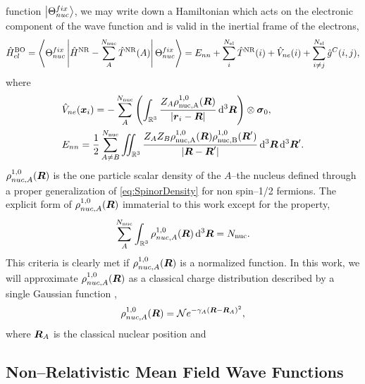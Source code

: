 function $\left\vert \Theta_{nuc}^{fix} \right\rangle$, we may write down a Hamiltonian which acts on the electronic 
component of the wave function and is valid in the inertial frame of the electrons,
\begin{equation}
\label{eq:NRBOH}
\hat{H}^{\mathrm{BO}}_{el} = \left\langle \Theta_{nuc}^{fix} \left\vert \hat{H}^{\mathrm{NR}} - \sum_A^{N_\mathrm{nuc}}\hat{T}^{\mathrm{NR}}(A) \right\vert \Theta_{nuc}^{fix} \right\rangle
=E_{nn} + \sum_i^{N_\mathrm{el}} \hat{T}^{\mathrm{NR}}(i) + \hat{V}_{ne}(i) + \sum_{i\neq j}^{N_\mathrm{el}} \hat{g}^C(i,j),
\end{equation}
where
\begin{align}
  &\hat{V}_{ne}(\boldsymbol{x}_i) = 
    -\sum^{N_\mathrm{nuc}}_A \left(\int_{\mathbb R^3} \frac{Z_A\rho^{1,0}_\mathrm{nuc,A}(\boldsymbol{R})}{\vert \boldsymbol{r}_i - \boldsymbol{R} \vert} \,\mathrm{d}^3\boldsymbol{R}\right) \otimes \boldsymbol{\sigma}_{0}, \label{eq:Vne}\\
&E_{nn} = \frac{1}{2} \sum^{N_\mathrm{nuc}}_{A\neq B} \int\mkern-12mu\int_{\mathbb R^3} \frac{Z_AZ_B\rho^{1,0}_\mathrm{nuc,A}(\boldsymbol{R})\rho^{1,0}_\mathrm{nuc,B}(\boldsymbol{R}')}{\vert \boldsymbol{R} - \boldsymbol{R}' \vert} \,\mathrm{d}^3\boldsymbol{R} \,\mathrm{d}^3\boldsymbol{R}'.
\end{align}
$\rho^{1,0}_{nuc,A}(\boldsymbol{R})$ is the one particle scalar density of the $A$--the nucleus defined through a proper generalization of
\cref{eq:SpinorDensity} for non spin--1/2 fermions. The explicit form of $\rho^{1,0}_{nuc,A}(\boldsymbol{R})$ immaterial
to this work except for the property,
\begin{equation}
\sum_A^{N_\mathrm{nuc}} \int_{\mathbb R^3} \rho_{nuc,A}^{1,0}(\boldsymbol{R}) \,\mathrm{d}^3\boldsymbol{R} = N_\mathrm{nuc}.
\end{equation}
This criteria is clearly met if $\rho^{1,0}_{nuc,A}(\boldsymbol{R})$ is a normalized function. In this work, we will approximate
$\rho^{1,0}_{nuc,A}(\boldsymbol{R})$ as a classical charge distribution described by a single Gaussian function ,
\begin{equation}
\rho^{1,0}_{nuc,A}(\boldsymbol{R}) = \mathcal{N} e^{-\gamma_A(\boldsymbol{R} - \boldsymbol{R}_A)^2},
\end{equation}
where $\boldsymbol{R}_A$ is the classical nuclear position and 



\subsection{Non--Relativistic Mean Field Wave Functions}




















